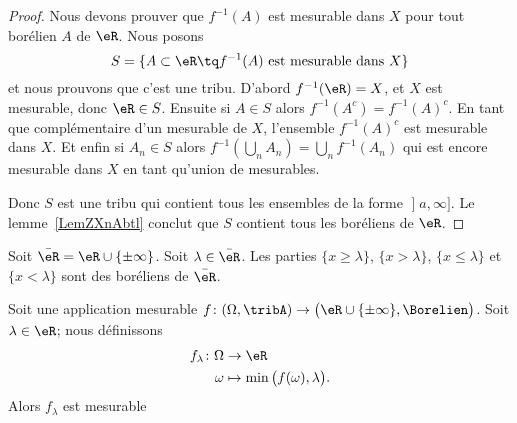 \begin{proof}
	Nous devons prouver que \( f^{-1}(A)\) est mesurable dans \( X\) pour tout borélien \( A\) de \( \eR\). Nous posons
	\begin{equation}
		S=\{ A\subset \eR\tq f^{-1}(A)\text{ est mesurable dans } X \}
	\end{equation}
	et nous prouvons que c'est une tribu. D'abord \( f^{-1}(\eR)=X\), et \( X\) est mesurable, donc \( \eR\in S\). Ensuite si \( A\in S\) alors \( f^{-1}(A^c)=f^{-1}(A)^c\). En tant que complémentaire d'un mesurable de \( X\), l'ensemble \( f^{-1}(A)^c\) est mesurable dans \( X\). Et enfin si \( A_n\in S \) alors \( f^{-1}(\bigcup_nA_n)=\bigcup_nf^{-1}(A_n)\) qui est encore mesurable dans \( X\) en tant qu'union de mesurables.

	Donc \( S\) est une tribu qui contient tous les ensembles de la forme \( \mathopen] a , \infty \mathclose]\). Le lemme~\ref{LemZXnAbtl} conclut que \( S\) contient tous les boréliens de \( \eR\).
\end{proof}

\begin{lemma}       \label{LEMooMYUFooKqdDNc}
    Soit \( \bar \eR=\eR\cup\{ \pm\infty \}\). Soit \( \lambda\in\bar \eR\).  Les parties \( \{ x\geq\lambda \}\), \( \{ x>\lambda \}\), \( \{ x\leq \lambda \}\) et \( \{ x<\lambda \}\) sont des boréliens de \( \bar\eR\).
\end{lemma}

\begin{lemma}       \label{LEMooAITEooMjHxvh}
    Soit une application mesurable \( f\colon (\Omega,\tribA)\to \big( \eR\cup\{ \pm\infty \},\Borelien \big)\). Soit \( \lambda\in \eR\); nous définissons
    \begin{equation}
        \begin{aligned}
            f_{\lambda}\colon \Omega&\to \eR \\
            \omega&\mapsto \min\big( f(\omega),\lambda \big). 
        \end{aligned}
    \end{equation}
    Alors \( f_{\lambda}\) est mesurable
\end{lemma}

